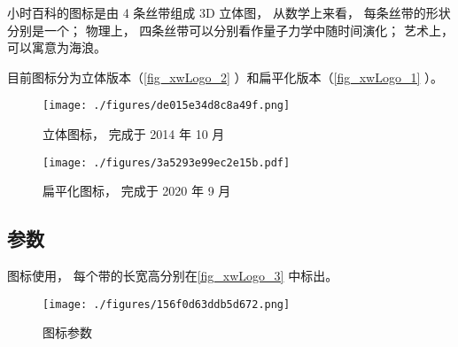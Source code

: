 
小时百科的图标是由 4 条丝带组成 3D 立体图， 从数学上来看， 每条丝带的形状分别是一个； 物理上， 四条丝带可以分别看作量子力学中随时间演化； 艺术上， 可以寓意为海浪。

目前图标分为立体版本（\autoref{fig_xwLogo_2} ）和扁平化版本（\autoref{fig_xwLogo_1} ）。

\begin{figure}[ht]
\centering
\texttt{[image: ./figures/de015e34d8c8a49f.png]}
\caption{立体图标， 完成于 2014 年 10 月} \label{fig_xwLogo_2}
\end{figure}

\begin{figure}[ht]
\centering
\texttt{[image: ./figures/3a5293e99ec2e15b.pdf]}
\caption{扁平化图标， 完成于 2020 年 9 月} \label{fig_xwLogo_1}
\end{figure}

\subsection{参数}
图标使用， 每个带的长宽高分别在\autoref{fig_xwLogo_3} 中标出。
\begin{figure}[ht]
\centering
\texttt{[image: ./figures/156f0d63ddb5d672.png]}
\caption{图标参数} \label{fig_xwLogo_3}
\end{figure}

